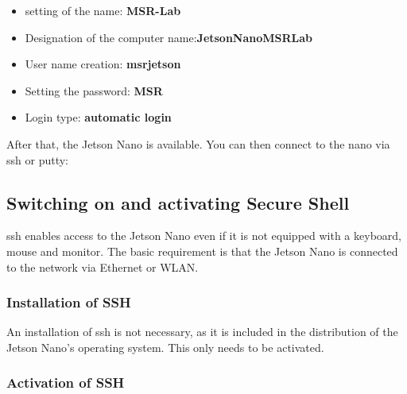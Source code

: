 \begin{itemize}
    \item setting of the name: \textbf{MSR-Lab}
    \item Designation of the computer name:\textbf{JetsonNanoMSRLab}
    \item User name creation: \textbf{msrjetson}
    \item Setting the password: \textbf{MSR}
    \item Login type: \textbf{automatic login}
\end{itemize}


\bigskip

After that, the Jetson Nano is available. You can then connect to the nano via ssh or putty:

\medskip


\subsection{Switching on and activating Secure Shell}

\ac{ssh} enables access to the Jetson Nano even if it is not equipped with a keyboard, mouse and monitor. The basic requirement is that the Jetson Nano is connected to the network via Ethernet or WLAN. 

\subsubsection{Installation of SSH}

An installation of \ac{ssh} is not necessary, as it is included in the distribution of the Jetson Nano's operating system. This only needs to be activated.

%
%
%
%
%


\subsubsection{Activation of SSH}

